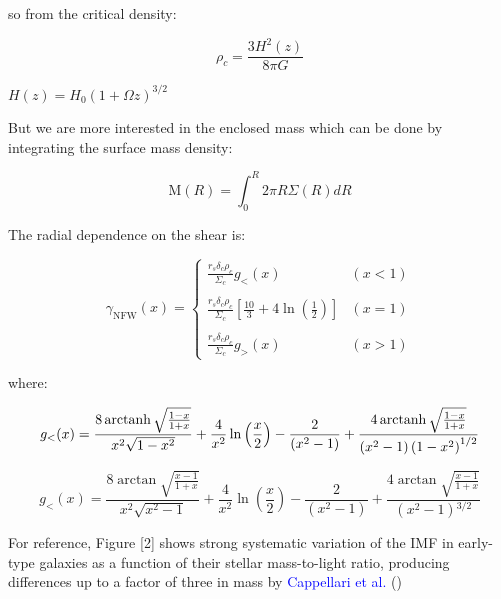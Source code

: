 \begin{appendices}
so from the critical density:

\begin{equation}
\rho_{c}=\frac{3H^2(z)}{8\pi G}
\end{equation}

$H(z)=H_{0}(1+\Omega z)^{3/2}$

But we are more interested in the enclosed mass which can be done by integrating the surface mass density:

\begin{equation}
\text{M}(R)=\int_{0}^{R}2\pi R\Sigma(R)dR
\end{equation}

The radial dependence on the shear is:

\begin{equation}
\gamma_{\text{NFW}}(x) = \left\lbrace
\begin{array}{lll}
\frac{r_{s}\delta_{c}\rho_{c}}{\Sigma_c}g_{<}(x) & (x<1)\\\\
\frac{r_{s}\delta_{c}\rho_{c}}{\Sigma_c}\left[\frac{10}{3}+4 \ln \left(\frac{1}{2}\right)\right] & (x=1)\\\\
\frac{r_{s}\delta_{c}\rho_{c}}{\Sigma_c}g_{>}(x) & (x>1)
\end{array}
\right.
\end{equation} 

where: 

\begin{equation}
g_{<}(x)=\frac{8 \operatorname{arctanh} \sqrt{\frac{1-x}{1+x}}}{x^{2}\sqrt{1-x^{2}}}+\frac{4}{x^{2}} \ln \left(\frac{x}{2}\right)-\frac{2}{\left(x^{2}-1\right)}+\frac{4 \operatorname{arctanh} \sqrt{\frac{1-x}{1+x}}}{\left(x^{2}-1\right)\left(1-x^{2}\right)^{1/2}}
\end{equation}

\begin{equation}
g_{<}(x)=\frac{8 \arctan \sqrt{\frac{x-1}{1+x}}}{x^{2}\sqrt{x^{2}-1}}+\frac{4}{x^{2}}\ln \left(\frac{x}{2}\right)-\frac{2}{\left(x^{2}-1\right)}+\frac{4 \arctan \sqrt{\frac{x-1}{1+x}}}{\left(x^{2}-1\right){}^{3/2}}
\end{equation}  

For reference, Figure [2] shows strong systematic variation of the IMF in early-type galaxies as a function of their stellar mass-to-light ratio, producing differences up to a factor of three in mass by \textcolor{blue}{Cappellari et al.} (\citeyear{Reference19})


\end{appendices}
